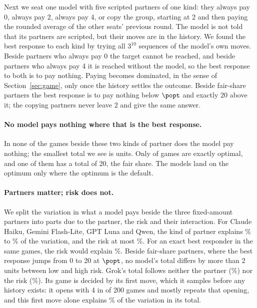 Next we seat one model with five scripted partners of one kind: they always pay 0, always pay
2, always pay 4, or copy the group, starting at 2 and then paying the rounded average of the
other seats' previous round. The model is not told that its partners are scripted, but their
moves are in the history. We found the best response to each kind by trying all $3^{10}$
sequences of the model's own moves. Beside partners who always pay 0 the target cannot be
reached, and beside partners who always pay 4 it is reached without the model, so the best
response to both is to pay nothing. Paying becomes dominated, in the sense of
Section~\ref{sec:game}, only once the history settles the outcome.
Beside fair-share partners the best response is to pay nothing below
$\popt$ and exactly 20 above it; the copying partners never leave 2 and give the same
answer.

\paragraph{No model pays nothing where that is the best response.}
In none of the \ScrDominatedGames{} games beside these two kinds of partner does the model pay
nothing; the smallest total we see is \ScrMinTotalDominated{} units. Only \ScrOptimalGames{}
of \ScrGames{} games are exactly optimal, and \ScrOptimalAllTwenty{} one of them has a total
of 20, the fair share. The models land on the optimum only where the optimum is the default.

\paragraph{Partners matter; risk does not.}
We split the variation in what a model pays beside the three fixed-amount partners into parts
due to the partner, the risk and their interaction. For Claude Haiku, Gemini Flash-Lite, GPT Luna and Qwen, the
kind of partner explains \ScrOpponentShareMin\% to \ScrOpponentShareMax\% of the variation,
and the risk at most \ScrRiskShareMax\%. For an exact best responder in the same games, the
risk would explain \ScrBestResponderRiskShare\%. Beside fair-share partners, where the best
response jumps from 0 to 20 at $\popt$, no model's total differs by more than 2 units
between low and high risk. Grok's total follows neither the partner (\ScrGrokOpponentShare\%)
nor the risk (\ScrGrokRiskShare\%). Its game is decided by its first move, which it samples
before any history exists: it opens with 4 in \ScrGrokOpenFour{} of 200 games and mostly
repeats that opening, and this first move alone explains \ScrGrokFirstMoveShare\% of the
variation in its total.

